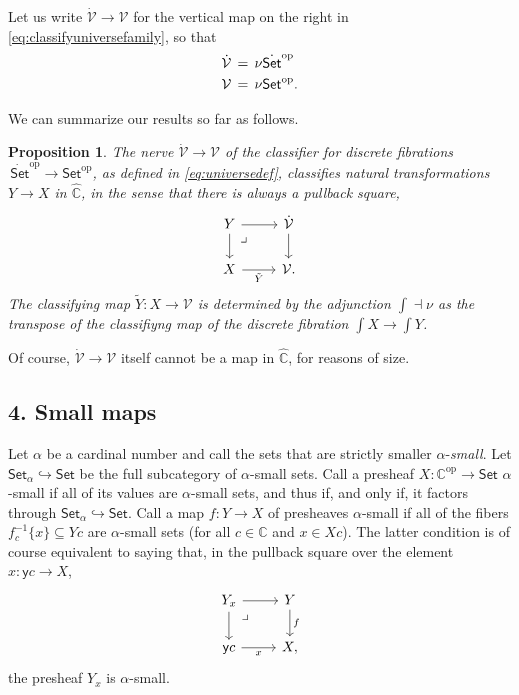 \documentclass[11pt]{article}
\newcommand{\C}{\ensuremath{\mathbb{C}}}
\newcommand{\op}[1]{\ensuremath{{#1}^{\mathrm{op}}}}
\newcommand{\Set}{\ensuremath{\mathsf{Set}}}
\newcommand{\y}{\ensuremath{\mathsf{y}}} %
\newcommand{\hook}{\ensuremath{\hookrightarrow}}
\renewcommand{\to}{\ensuremath{\rightarrow}}
\newcommand{\SSet}{\ensuremath{\,\dot{\Set}}}
\newcommand{\V}{\ensuremath{\mathcal{V}}}
\newcommand{\VV}{\ensuremath{\dot{\mathcal{V}}}}
\newcommand{\elem}[1]{\textstyle\int\!{#1}}
\newcommand{\pbmark}{\ar[dr, phantom, "\lrcorner" very near start, shift right=.5ex]}	%
\newtheorem{proposition}[theorem]{Proposition}
\theoremstyle{remark}
\theoremstyle{definition}
\begin{document}
Let us write $\VV \to \V$ for the vertical map on the right in \eqref{eq:classifyuniversefamily}, so that
\begin{align}\label{eq:universedef}\textstyle
\VV\, &=\, \nu\op{\dot{\Set}}\\  
\V\, &=\, \nu\op{\Set}.\notag
 \end{align}
 
 We can summarize our results so far as follows.

 \begin{proposition}\label{prop:Vclassifies}
The nerve $\VV\to\V$  of the classifier for discrete fibrations $\op\SSet\to\op\Set$, as defined in \eqref{eq:universedef}, classifies natural transformations $Y\to X$ in $\widehat{\C}$, in the sense that there is always a pullback square,
\begin{equation}\label{eq:classifyuniversefamily2}\textstyle
\begin{tikzcd}
	 Y \ar[d] \pbmark \ar[r] & \VV \ar[d] \\  
	X \ar[r,swap, "\tilde{Y} "] &  \V.
 \end{tikzcd}
 \end{equation}
The classifying map $\tilde{Y} : X\to \V$ is determined by the adjunction $\int \dashv \nu$ as the transpose of the classifiyng map of the discrete fibration $\elem X\to\elem Y$.
\end{proposition}
 
 Of course, $\VV\to\V$ itself cannot be a map in $\widehat{\C}$, for reasons of size.

\subsection*{4. Small maps}

Let $\alpha$ be a cardinal number and call the sets that are strictly smaller $\alpha$-\emph{small}.  Let $\Set_\alpha\hook\Set$ be the full subcategory of $\alpha$-small sets.  
Call a presheaf $X : \op{\C} \to \Set$ $\alpha$-small if all of its values are $\alpha$-small sets, and thus if, and only if, it factors through $\Set_\alpha\hook\Set$. Call a map $f:Y\to X$ of presheaves $\alpha$-small if all of the fibers $f_c^{-1}\{ x\} \subseteq Yc$ are $\alpha$-small sets (for all $c\in\C$ and $x\in Xc$). The latter condition is of course equivalent to saying that, in the pullback square over the element $x:\y{c} \to X$, 
\begin{equation}\label{eq:smallmap}\textstyle
\begin{tikzcd}
	 Y_x \ar[d] \pbmark \ar[r] & Y \ar[d, "f"] \\  
	\y{c} \ar[r,swap,"x"] &  X,
 \end{tikzcd}
 \end{equation}
the presheaf $Y_x$ is $\alpha$-small.
\end{document}
